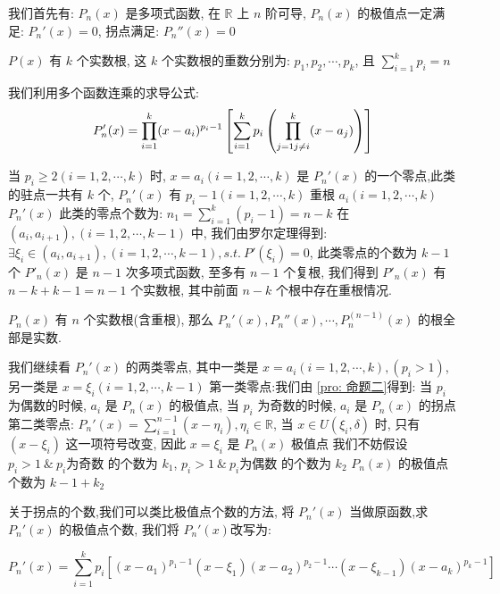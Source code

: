 \begin{anymark}[证明]
	我们首先有: $P_{n}(x)$ 是多项式函数, 在 $\mathbb{R}$ 上 $n$ 阶可导, $P_{n}(x)$ 的极值点一定满足: $P_{n}'(x) = 0$, 拐点满足: $P_{n}''(x) = 0$

	$P(x)$ 有 $k$ 个实数根, 这 $k$ 个实数根的重数分别为: $p_{1},p_{2},\cdots,p_{k}$, 且 $\sum\limits_{i=1}^{k}p_{i}= n$

	我们利用多个函数连乘的求导公式:
	$$P_{n}'(x) =  \prod\limits_{i=1}^{k}(x-a_{i})^{p_{i}-1}\left[\sum\limits_{i=1}^{k}p_{i}\left(\prod\limits_{j=1\\j\neq i}^{k}(x-a_{j})\right)\right]$$

	当 $p_{i} \geq 2 (i = 1,2,\cdots,k)$ 时, $x=a_{i}(i=1,2,\cdots,k)$ 是 $P_{n}'(x)$ 的一个零点,此类的驻点一共有 $k$ 个, $P_{n}'(x)$ 有 $p_{i}-1 (i=1,2,\cdots,k)$ 重根 $a_{i}(i=1,2,\cdots,k)$
	$P_{n}'(x)$ 此类的零点个数为: $n_{1} = \sum\limits_{i=1}^{k}(p_{i}-1) = n-k$
	在 $(a_{i},a_{i+1}),(i=1,2,\cdots,k-1)$ 中, 我们由罗尔定理得到: $\exists \xi_{i}\in(a_{i},a_{i+1}),(i=1,2,\cdots,k-1), s.t.\ P'(\xi_{i}) = 0$, 此类零点的个数为 $k-1$ 个
	$P'_{n}(x)$ 是 $n-1$ 次多项式函数, 至多有 $n-1$ 个复根, 我们得到 $P'_{n}(x)$ 有 $n-k+k-1 = n-1$ 个实数根, 其中前面 $n-k$ 个根中存在重根情况.
	\begin{corollary}[多项式函数零点]
		$P_{n}(x)$ 有 $n$ 个实数根(含重根), 那么 $P_{n}'(x),P_{n}''(x),\cdots,P_{n}^{(n-1)}(x)$ 的根全部是实数.
	\end{corollary}

	我们继续看 $P_{n}'(x)$ 的两类零点, 其中一类是 $x=a_{i}(i=1,2,\cdots,k),(p_{i}>1)$, 另一类是 $x=\xi_{i}(i=1,2,\cdots,k-1)$
	第一类零点:我们由 \ref{pro: 命题二}得到: 当 $p_{i}$ 为偶数的时候, $a_{i}$ 是 $P_{n}(x)$ 的极值点, 当 $p_{i}$ 为奇数的时候, $a_{i}$ 是 $P_{n}(x)$ 的拐点
	第二类零点: $P_{n}'(x) = \sum\limits_{i=1}^{n-1}(x-\eta_{i}),\eta_{i}\in\mathbb{R}$, 当 $x\in U(\xi_{i},\delta)$ 时, 只有 $(x-\xi_{i})$ 这一项符号改变, 因此 $x=\xi_{i}$ 是 $P_{n}(x)$ 极值点
	我们不妨假设 $p_{i} > 1\ \&\ p_{i}\text{为奇数}$ 的个数为 $k_{1}$, $p_{i} > 1\ \&\ p_{i}\text{为偶数}$ 的个数为 $k_{2}$
	$P_{n}(x)$ 的极值点个数为 $k-1+k_{2}$

	关于拐点的个数,我们可以类比极值点个数的方法, 将 $P_{n}'(x)$ 当做原函数,求 $P_{n}'(x)$ 的极值点个数, 我们将 $P_{n}'(x)$改写为:
	
	$$P_{n}'(x) = \sum\limits_{i=1}^{k}p_{i}\left[(x-a_{1})^{p_{1}-1}(x-\xi_{1})(x-a_{2})^{p_{2}-1}\cdots(x-\xi_{k-1})(x-a_{k})^{p_{k}-1}\right]$$


\end{anymark}
